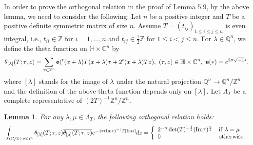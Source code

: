 \documentclass[11pt]{amsart}
\numberwithin{equation}{section}
\newtheorem{lemma}[theorem]{Lemma}
\theoremstyle{definition}
\begin{document}
In order to prove the orthogonal relation in the proof of Lemma 5.9, by the above lemma, we need to consider the following:
Let $n$ be a positive integer and $T$ be a positive definite symmetric matrix of size $n$. 
Assume $T=(t_{ij})_{1\le i\le j\le n}$ is even integral, i.e., $t_{ii}\in {\mathbb{Z}}$ for $i=1,\ldots,n$ and 
$t_{ij}\in \frac{1}{2}{\mathbb{Z}}$ for $1\le i<j\le n$. 
For $\lambda\in {\mathbb{Q}}^n$, we define the theta function on $\mathbb{H}\times{\mathbb{C}}^n$ by 
$$\theta_{[\lambda]}(T;\tau,z)=\sum_{x\in{\mathbb{Z}}^n}\bold{e}({}^t(x+\lambda)T(x+\lambda)\tau+2{}^t(x+\lambda)Tz),\ 
(\tau,z)\in\mathbb{H}\times{\mathbb{C}}^n,\ \bold{e}(\ast)=e^{2\pi\sqrt{-1}\ast},
$$ 
where $[\lambda]$ stands for the image of $\lambda$ under the natural projection ${\mathbb{Q}}^n{\longrightarrow} {\mathbb{Q}}^n/{\mathbb{Z}}^n$ and 
the definition of the above theta function depends only on $[\lambda]$. 
Let $\Lambda_T$ be a complete representative of $(2T)^{-1}{\mathbb{Z}}^n/{\mathbb{Z}}^n$.  
\begin{lemma}\label{ortho} For any $\lambda,\mu\in \Lambda_T$, the following orthogonal relation holds: 
$${\displaystyle}\int_{({\mathbb{C}}/{\mathbb{Z}}+\tau{\mathbb{Z}})^n}
 \theta_{[\lambda]}(T;\tau,z)\overline{\theta_{[\mu]}(T;\tau,z)}e^{-4\pi({\rm Im} \tau)^{-1}
T[{\rm Im} z]}dz
=\left\{
\begin{array}{ll}
2^{-n}\det(T)^{-\frac{1}{2}}({\rm Im} \tau)^{\frac{n}{2}} & {\rm if}\ \lambda=\mu \\
0& {\rm otherwise}.
\end{array}\right.
$$ 
\end{lemma}
\end{document}
